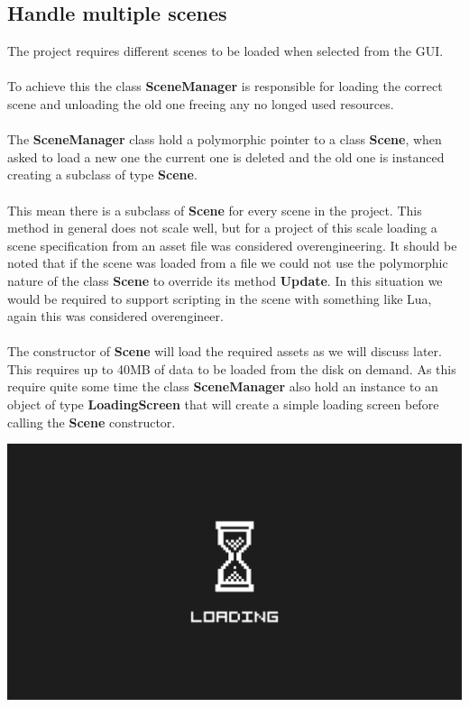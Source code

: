 \documentclass[12pt, a4paper]{article}
\begin{document}
\subsection{Handle multiple scenes}
The project requires different scenes to be loaded when selected from the GUI.\\\\
To achieve this the class \textbf{SceneManager} is responsible for loading the correct scene and unloading the old one
freeing any no longed used resources.\\\\
The \textbf{SceneManager} class hold a polymorphic pointer to a class \textbf{Scene}, when asked to load a new one
the current one is deleted and the old one is instanced creating a subclass of type \textbf{Scene}.\\\\
This mean there is a subclass of \textbf{Scene} for every scene in the project. This method in general does not
scale well, but for a project of this scale loading a scene specification from an asset file was considered overengineering.
It should be noted that if the scene was loaded from a file we could not use the polymorphic nature of the class
\textbf{Scene} to override its method \textbf{Update}. In this situation we would be required to support scripting in the
scene with something like Lua, again this was considered overengineer.\\\\
The constructor of \textbf{Scene} will load the required assets as we will discuss later. This requires up to 40MB of 
data to be loaded from the disk on demand. As this require quite some time the class \textbf{SceneManager} also
hold an instance to an object of type \textbf{LoadingScreen} that will create a simple loading screen before calling
the \textbf{Scene} constructor.
\begin{center}
    \centering
    \includegraphics[width=1.0\textwidth]{img/loading.png}
\end{center}
\end{document}
